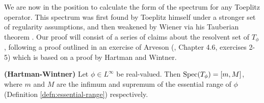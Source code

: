 \documentclass[../main.tex]{subfiles}
\begin{document}
We are now in the position to calculate the form of the spectrum for any Toeplitz operator. This spectrum was first found by Toeplitz
himself under a stronger set of regularity assumptions, and then weakened by Wiener via his Tauberian theorem \parencite{schmidt1960toeplitz}.
Our proof will consist of a series of claims about the resolvent set of $T_\phi$, following a proof outlined in an exercise of Arveson (\parencite{arveson2002short}, Chapter 4.6, exercises 2-5) which is based on a proof by Hartman and Wintner.

\begin{theorem}{\textbf{(Hartman-Wintner)}}\label{thm:hartman-wintner}
Let $\phi \in L^\infty$ be real-valued. Then $\mathrm{Spec}(T_\phi) = [m, M]$, where $m$ and $M$ are the infimum and supremum of the essential range of $\phi$ (Definition \ref{defn:essential-range}) respectively.
\end{theorem}
\end{document}
